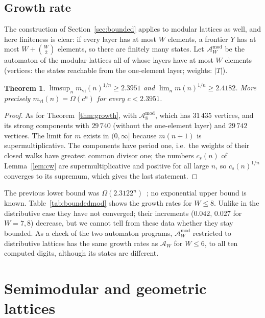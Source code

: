 \documentclass[11pt]{amsart}
\newtheorem{theorem}{Theorem}[section]
\theoremstyle{definition}
\theoremstyle{remark}
\begin{document}
\subsection{Growth rate}
The construction of Section~\ref{sec:bounded} applies to modular lattices as well, and here
finiteness is clear: if every layer has at most $W$ elements, a frontier $Y$ has at most
$W + \binom{W}{2}$ elements, so there are finitely many states.  Let $\mathcal{A}^{\mathrm{mod}}_W$
be the automaton of the modular lattices all of whose layers have at most $W$ elements
(vertices: the states reachable from the one-element layer; weights: $|T|$).

\begin{theorem}\label{thm:modgrowth}
$\limsup_n m_{\mathrm{vi}}(n)^{1/n} \ge 2.3951$ and $\lim_n m(n)^{1/n} \ge 2.4182$.  More precisely
$m_{\mathrm{vi}}(n) = \Omega(c^n)$ for every $c < 2.3951$.
\end{theorem}

\begin{proof}
As for Theorem~\ref{thm:growth}, with $\mathcal{A}^{\mathrm{mod}}_8$, which has $31\,435$
vertices, and its strong components with $29\,740$ (without the one-element layer) and
$29\,742$ vertices.  The limit for $m$ exists in $(0,\infty]$ because $m(n+1)$ is
supermultiplicative.  The components have period one, i.e.\ the weights of their closed
walks have greatest common divisor one; the numbers $c_s(n)$ of Lemma~\ref{lem:cw} are
supermultiplicative and positive for all large $n$, so $c_s(n)^{1/n}$ converges to its
supremum, which gives the last statement.
\end{proof}

The previous lower bound was $\Omega(2.3122^n)$~\cite{Koh21}; no exponential upper bound is
known.  Table~\ref{tab:boundedmod} shows the growth rates for $W \le 8$.  Unlike in the
distributive case they have not converged; their increments ($0.042$, $0.027$ for
$W = 7, 8$) decrease, but we cannot tell from these data whether they stay bounded.  As a
check of the two automaton programs, $\mathcal{A}^{\mathrm{mod}}_W$ restricted to distributive
lattices has the same growth rates as $\mathcal{A}_W$ for $W \le 6$, to all ten computed digits,
although its states are different.

\boundedtablemod

\section{Semimodular and geometric lattices}\label{sec:other}
\end{document}
